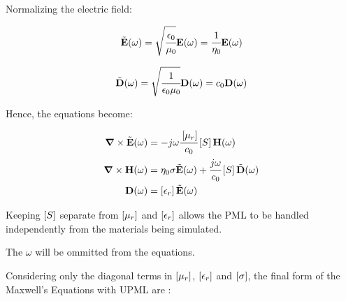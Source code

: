 Normalizing the electric field:

\begin{equation}
    \tilde{\textbf{E}}(\omega) = \sqrt{\cfrac{\epsilon_0}{\mu_0}}\textbf{E}(\omega) = \cfrac{1}{\eta_0}\textbf{E}(\omega)
\end{equation}

\begin{equation}
    \tilde{\textbf{D}}(\omega) = \sqrt{\cfrac{1}{\epsilon_0\mu_0}} \textbf{D}(\omega) = c_0 \textbf{D}(\omega)
\end{equation}

Hence, the equations become:

\begin{align}
    \rot \Enw (\omega) &= -j\omega\cfrac{\brackets{\mu_r}}{c_0} \brackets{S} \Hh (\omega) \\
    \rot \Hh (\omega) &= \eta_0 \sigma \Enw(\omega) + \cfrac{j\omega}{c_0}\brackets{S} \Dnw (\omega) \\
    \D (\omega) &= \brackets{\epsilon _r} \Enw (\omega)
\end{align}

Keeping $\brackets{S}$ separate from $\brackets{\mu_r}$ and $\brackets{\epsilon_r}$ allows the PML to be handled independently from the materials being simulated.

The $\omega$ will be ommitted from the equations.

Considering only the diagonal terms in $\brackets{\mu_r}$, $\brackets{\epsilon_r}$ and $\brackets{\sigma}$, the final form of the Maxwell's Equations with UPML are \cite{empossible_3d_pml}:

